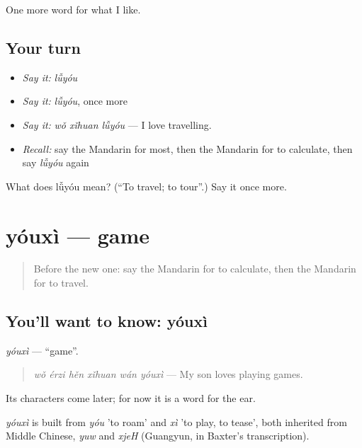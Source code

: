 \begin{grammarlens}[title={What you've built}]
One more word for what I like.
\end{grammarlens}

\subsection*{Your turn}
\begin{itemize}
\raggedright
  \item \emph{Say it:} \emph{lǚyóu}
  \item \emph{Say it:} \emph{lǚyóu}, once more
  \item \emph{Say it:} \emph{wǒ xǐhuan lǚyóu} — I love travelling.
  \item \emph{Recall:} say the Mandarin for most, then the Mandarin for to calculate, then say \emph{lǚyóu} again
\end{itemize}

\begin{tcolorbox}[breakable,colback=teal!4,colframe=teal!35!black,title={Before you move on}]
What does lǚyóu mean? (\textquotedblleft{}To travel; to tour\textquotedblright{}.) Say it once more.
\end{tcolorbox}
\section[yóuxì]{yóuxì — game}

\label{lesson:ZH-C141-youxi}



\begin{quote}
Before the new one: say the Mandarin for to calculate, then the Mandarin for to travel.
\end{quote}

\subsection*{You'll want to know: yóuxì}
\emph{yóuxì} — \textquotedblleft{}game\textquotedblright{}.

\begin{quote}
\emph{wǒ érzi hěn xǐhuan wán yóuxì} — My son loves playing games.
\end{quote}

Its characters come later; for now it is a word for the ear.

\begin{cousinweb}
\emph{yóuxì} is built from \emph{yóu} 'to roam' and \emph{xì} 'to play, to tease', both inherited from Middle Chinese, \emph{yuw} and \emph{xjeH} (Guangyun, in Baxter's transcription).
\end{cousinweb}

